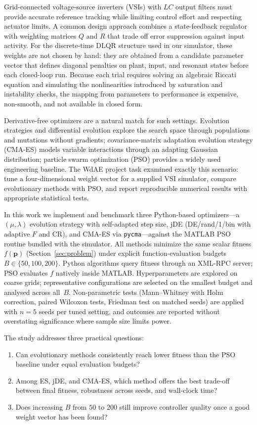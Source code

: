 \documentclass[pdflatex,sn-mathphys-num]{sn-jnl}
\begin{document}
Grid-connected voltage-source inverters (VSIs) with $LC$ output filters must provide accurate reference tracking while limiting control effort and respecting actuator limits.
A common design approach combines a state-feedback regulator with weighting matrices $Q$ and $R$ that trade off error suppression against input activity.
For the discrete-time DLQR structure used in our simulator, these weights are not chosen by hand: they are obtained from a candidate parameter vector that defines diagonal penalties on plant, input, and resonant states before each closed-loop run.
Because each trial requires solving an algebraic Riccati equation and simulating the nonlinearities introduced by saturation and instability checks, the mapping from parameters to performance is expensive, non-smooth, and not available in closed form.

Derivative-free optimizers are a natural match for such settings.
Evolution strategies and differential evolution explore the search space through populations and mutations without gradients; covariance-matrix adaptation evolution strategy (CMA-ES) models variable interactions through an adapting Gaussian distribution; particle swarm optimization (PSO) provides a widely used engineering baseline.
The WdAE project task examined exactly this scenario: tune a four-dimensional weight vector for a supplied VSI simulator, compare evolutionary methods with PSO, and report reproducible numerical results with appropriate statistical tests.

In this work we implement and benchmark three Python-based optimizers---a $(\mu,\lambda)$ evolution strategy with self-adapted step size, jDE (DE/rand/1/bin with adaptive $F$ and $\mathrm{CR}$), and CMA-ES via \texttt{pycma}---against the MATLAB PSO routine bundled with the simulator.
All methods minimize the same scalar fitness $f(\mathbf{p})$ (Section~\ref{sec:problem}) under explicit function-evaluation budgets $B\in\{50,100,200\}$.
Python algorithms query fitness through an XML-RPC server; PSO evaluates $f$ natively inside MATLAB.
Hyperparameters are explored on coarse grids; representative configurations are selected on the smallest budget and analysed across all~$B$.
Non-parametric tests (Mann--Whitney with Holm correction, paired Wilcoxon tests, Friedman test on matched seeds) are applied with $n=5$ seeds per tuned setting, and outcomes are reported without overstating significance where sample size limits power.

The study addresses three practical questions:
\begin{enumerate}
  \item Can evolutionary methods consistently reach lower fitness than the PSO baseline under equal evaluation budgets?
  \item Among ES, jDE, and CMA-ES, which method offers the best trade-off between final fitness, robustness across seeds, and wall-clock time?
  \item Does increasing $B$ from $50$ to $200$ still improve controller quality once a good weight vector has been found?
\end{enumerate}
\end{document}
